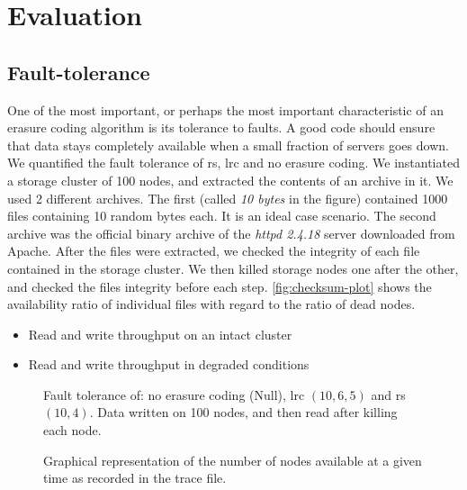 \section{Evaluation}
\label{sec:evaluation}

\subsection{Fault-tolerance}
\label{subsec:fault-tolerance}

One of the most important, or perhaps the most important characteristic of an erasure coding algorithm is its tolerance to faults.
A good code should ensure that data stays completely available when a small fraction of servers goes down.
We quantified the fault tolerance of \acf{rs}, \acf{lrc} and no erasure coding.
We instantiated a storage cluster of 100 nodes, and extracted the contents of an archive in it.
We used 2 different archives.
The first (called \textit{10 bytes} in the figure) contained 1000 files containing 10 random bytes each.
It is an ideal case scenario.
The second archive was the official binary archive of the \textit{httpd 2.4.18} server downloaded from Apache.
After the files were extracted, we checked the integrity of each file contained in the storage cluster.
We then killed storage nodes one after the other, and checked the files integrity before each step.
\autoref{fig:checksum-plot} shows the availability ratio of individual files with regard to the ratio of dead nodes.


\begin{itemize}
    \item Read and write throughput on an intact cluster
    \item Read and write throughput in degraded conditions
    \
\end{itemize}

\begin{figure}
    \centering
    
    \caption{Fault tolerance of: no erasure coding (Null), \acl{lrc} $\left(10,6,5\right)$ and \acl{rs} $\left(10,4\right)$. Data written on 100 nodes, and then read after killing each node.}
    \label{fig:checksum-plot}
\end{figure}

\begin{figure*}
    \centering
    
    \caption{Graphical representation of the number of nodes available at a given time as recorded in the trace file.}
    \label{fig:trace-plot}
\end{figure*}

